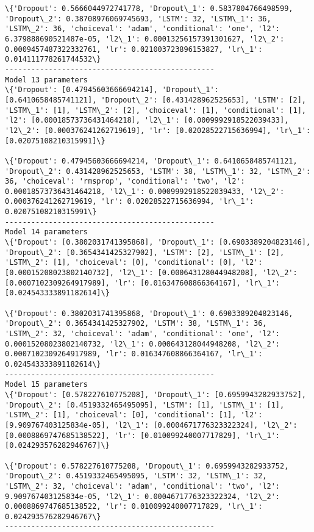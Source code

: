 \documentclass[11pt]{article}
\begin{document}
\begin{Verbatim}[commandchars=\\\{\}]
\{'Dropout': 0.5666044972741778, 'Dropout\_1': 0.5837804766498599, 'Dropout\_2': 0.38708976069745693, 'LSTM': 32, 'LSTM\_1': 36, 'LSTM\_2': 36, 'choiceval': 'adam', 'conditional': 'one', 'l2': 6.379888690521487e-05, 'l2\_1': 0.00013256157391301627, 'l2\_2': 0.0009457487322332761, 'lr': 0.021003723896153827, 'lr\_1': 0.014111778261744532\}
------------------------------------------------
Model 13 parameters
\{'Dropout': [0.47945603666694214], 'Dropout\_1': [0.6410658485741121], 'Dropout\_2': [0.431428962525653], 'LSTM': [2], 'LSTM\_1': [1], 'LSTM\_2': [2], 'choiceval': [1], 'conditional': [1], 'l2': [0.00018573736431464218], 'l2\_1': [0.0009992918522039433], 'l2\_2': [0.000376241262719619], 'lr': [0.02028522715636994], 'lr\_1': [0.02075108210315991]\}

\{'Dropout': 0.47945603666694214, 'Dropout\_1': 0.6410658485741121, 'Dropout\_2': 0.431428962525653, 'LSTM': 38, 'LSTM\_1': 32, 'LSTM\_2': 36, 'choiceval': 'rmsprop', 'conditional': 'two', 'l2': 0.00018573736431464218, 'l2\_1': 0.0009992918522039433, 'l2\_2': 0.000376241262719619, 'lr': 0.02028522715636994, 'lr\_1': 0.02075108210315991\}
------------------------------------------------
Model 14 parameters
\{'Dropout': [0.3802031741395868], 'Dropout\_1': [0.6903389204823146], 'Dropout\_2': [0.3654341425327902], 'LSTM': [2], 'LSTM\_1': [2], 'LSTM\_2': [1], 'choiceval': [0], 'conditional': [0], 'l2': [0.00015208023802140732], 'l2\_1': [0.000643128044948208], 'l2\_2': [0.0007102309264917989], 'lr': [0.016347608866364167], 'lr\_1': [0.024543333891182614]\}

\{'Dropout': 0.3802031741395868, 'Dropout\_1': 0.6903389204823146, 'Dropout\_2': 0.3654341425327902, 'LSTM': 38, 'LSTM\_1': 36, 'LSTM\_2': 32, 'choiceval': 'adam', 'conditional': 'one', 'l2': 0.00015208023802140732, 'l2\_1': 0.000643128044948208, 'l2\_2': 0.0007102309264917989, 'lr': 0.016347608866364167, 'lr\_1': 0.024543333891182614\}
------------------------------------------------
Model 15 parameters
\{'Dropout': [0.578227610775208], 'Dropout\_1': [0.6959943282933752], 'Dropout\_2': [0.4519332465495095], 'LSTM': [1], 'LSTM\_1': [1], 'LSTM\_2': [1], 'choiceval': [0], 'conditional': [1], 'l2': [9.909767403125834e-05], 'l2\_1': [0.0004671776323322324], 'l2\_2': [0.0008869747685138522], 'lr': [0.010099240007717829], 'lr\_1': [0.024293576282946767]\}

\{'Dropout': 0.578227610775208, 'Dropout\_1': 0.6959943282933752, 'Dropout\_2': 0.4519332465495095, 'LSTM': 32, 'LSTM\_1': 32, 'LSTM\_2': 32, 'choiceval': 'adam', 'conditional': 'two', 'l2': 9.909767403125834e-05, 'l2\_1': 0.0004671776323322324, 'l2\_2': 0.0008869747685138522, 'lr': 0.010099240007717829, 'lr\_1': 0.024293576282946767\}
------------------------------------------------

    \end{Verbatim}
\end{document}

